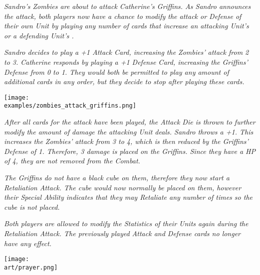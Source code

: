 \begin{multicols*}{2}
\textit{Sandro's Zombies are about to attack Catherine's Griffins.
As Sandro announces the attack, both players now have a chance to modify the attack or Defense of their own Unit by playing any number of  cards that increase an attacking Unit's  or a defending Unit's .}\par
\textit{Sandro decides to play a +1 Attack Card, increasing the Zombies' attack from 2 to 3.
Catherine responds by playing a +1 Defense Card, increasing the Griffins' Defense from 0 to 1.
They would both be permitted to play any amount of additional cards in any order, but they decide to stop after playing these cards.}\par

\texttt{[image: \\examples/zombies\_attack\_griffins.png]}

\textit{After all cards for the attack have been played, the Attack Die is thrown to further modify the amount of damage the attacking Unit deals.
Sandro throws a +1.
This increases the Zombies' attack from 3 to 4, which is then reduced by the Griffins' Defense of 1. Therefore, 3 damage  is placed on the Griffins. Since they have a HP  of 4, they are not removed from the Combat.}\par
\textit{The Griffins do not have a black cube on them, therefore they now start a Retaliation Attack.
The cube would now normally be placed on them, however their Special  Ability indicates that they may Retaliate any number of times so the cube is not placed.}\par
\textit{Both players are allowed to modify the Statistics of their Units again during the Retaliation Attack.
The previously played Attack and Defense cards no longer have any effect.}

\vfill

\texttt{[image: \\art/prayer.png]}

\end{multicols*}
